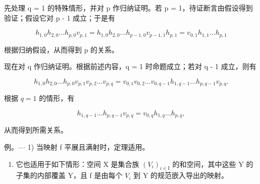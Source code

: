 先处理 q = 1 的特殊情形，并对 p 作归纳证明。若 p = 1，待证断言由假设得到验证；假设它对 p - 1 成立；于是有

\[
h _ {1, 0} h _ {2, 0} \dots h _ {p, 0} v _ {p, 1} = h _ {1, 0} h _ {2, 0} \dots h _ {p - 1, 0} v _ {p - 1, 1} h _ {p, 1} = v _ {0, 1} h _ {1, 1} \dots h _ {p, 1}
\]

根据归纳假设，从而得到 p 的关系。

现在对 q 作归纳证明。根据前述内容，q = 1 时命题成立；若对 q - 1 成立，则有

\[
h _ {1, 0} h _ {2, 0} \dots h _ {p, 0} v _ {p, 1} v _ {p, 2} \dots v _ {p, q} = v _ {0, 1} v _ {0, 2} \dots v _ {0, q - 1} h _ {1, q - 1} \dots h _ {p, q - 1} v _ {p, q}.
\]

根据 \(q = 1\) 的情形，有

\[
h _ {1, q - 1} \dots h _ {p, q - 1} v _ {p, q} = v _ {0, q} h _ {1, q} \dots h _ {p, q},
\]

从而得到所需关系。

例。--- 1) 当映射 f 平展且满射时，定理适用。

\begin{enumerate}
\def\labelenumi{\arabic{enumi})}
\setcounter{enumi}{1}
\tightlist
\item
  它也适用于如下情形：空间 X 是集合族 \((V_{i})_{i\in\mathrm{I}}\) 的和空间，其中这些 Y 的子集的内部覆盖 Y，且 f 是由每个 \(V_{i}\) 到 Y 的规范嵌入导出的映射。
\end{enumerate}

